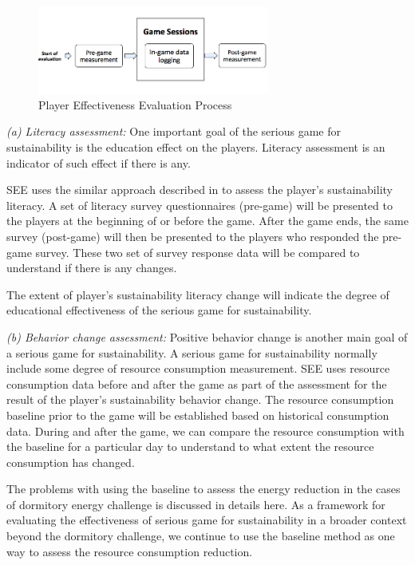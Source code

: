 \documentclass{sigchi}
\begin{document}
\begin{figure}
  \center
  \includegraphics[width=3in]{pre-post-eval}
  \caption{Player Effectiveness Evaluation Process}
  \label{fig:pre-post-eval}
\end{figure}

\emph {(a) Literacy assessment:} One important goal of the serious
game for sustainability is the education effect on the
players. Literacy assessment is an indicator of such effect if there
is any.

SEE uses the similar approach described in \cite{csdl2-10-08} to
assess the player's sustainability literacy. A set of literacy survey
questionnaires (pre-game) will be presented to the players at the
beginning of or before the game. After the game ends, the same survey
(post-game) will then be presented to the players who responded the
pre-game survey. These two set of survey response data will be
compared to understand if there is any changes.

The extent of player's sustainability literacy change will indicate
the degree of educational effectiveness of the serious game for
sustainability.

\emph {(b) Behavior change assessment:} Positive behavior change is
another main goal of a serious game for sustainability. A serious game
for sustainability normally include some degree of resource
consumption measurement. SEE uses resource consumption data before and
after the game as part of the assessment for the result of the
player's sustainability behavior change.  The resource consumption
baseline prior to the game will be established based on historical
consumption data. During and after the game, we can compare the
resource consumption with the baseline for a particular day to
understand to what extent the resource consumption has changed.

The problems with using the baseline to assess the energy reduction in
the cases of dormitory energy challenge is discussed in details
here\cite{csdl2-12-08}.  As a framework for evaluating the
effectiveness of serious game for sustainability in a broader context
beyond the dormitory challenge, we continue to use the baseline
method as one way to assess the resource consumption reduction.
\end{document}
